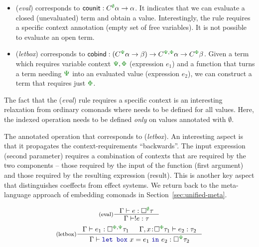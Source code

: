 \begin{itemize}
\item (\emph{eval}) corresponds to $\ident{counit} : \ctyp{\cclrd{\emptyset}}{\alpha} \rightarrow \alpha$. 
  It indicates that we can evaluate a closed (unevaluated) term and obtain a value. Interestingly, the 
  rule requires a specific context annotation (empty set of free variables). 
  It is not possible to evaluate an open term.

\item (\emph{letbox}) corresponds to $\ident{cobind} : (\ctyp{\cclrd{\Psi}}{\alpha} \rightarrow \beta) 
  \rightarrow \ctyp{\cclrd{\Psi}, \cclrd{\Phi}}{\alpha} \rightarrow \ctyp{\cclrd{\Phi}}{\beta}$. 
  Given a term which requires variable context $\cclrd{\Psi}, \cclrd{\Phi}$ 
  (expression $e_1$) and a function that turns a term needing $\cclrd{\Psi}$ into an evaluated 
  value (expression $e_2$), we can construct a term that requires just $\cclrd{\Phi}$.
\end{itemize}

\noindent
The fact that the (\emph{eval}) rule requires a specific context is an interesting relaxation
from ordinary comonads where  needs to be defined for all values. Here, the indexed
 operation needs to be defined \emph{only} on values annotated with $\emptyset$.

The annotated  operation that corresponds to (\emph{letbox}). An interesting aspect 
is that it propagates the context-requirements ``backwards''. The input expression (second parameter) 
requires a combination of contexts that are required by the two components -- those required by the 
input of the function (first argument) and those required by the resulting expression (result). 
This is another key aspect that distinguishes coeffects from effect systems. We return back to 
the meta-language approach of embedding comonads in Section~\ref{sec:unified-meta}.


\begin{figure}
\begin{equation*}
\inference[(eval)]
  {\Gamma \vdash e : \square^{\cclrd{\emptyset}}{\tau}}
  {\Gamma \vdash !e : \tau}
\end{equation*}
\begin{equation*}
\inference[(letbox)]
  { \Gamma \vdash e_1 : \square^{\cclrd{\Phi}, \cclrd{\Psi}}{\tau_1} & 
    \Gamma, x\!:\!\square^{\cclrd{\Phi}}{\tau_1} \vdash e_2 : \tau_2 }
  { \Gamma \vdash \kvd{let~box}~x=e_1~\kvd{in}~e_2 : \square^{\cclrd{\Psi}}{\tau_2}}
\end{equation*}

\label{fig:modal-meta}
\end{figure}

